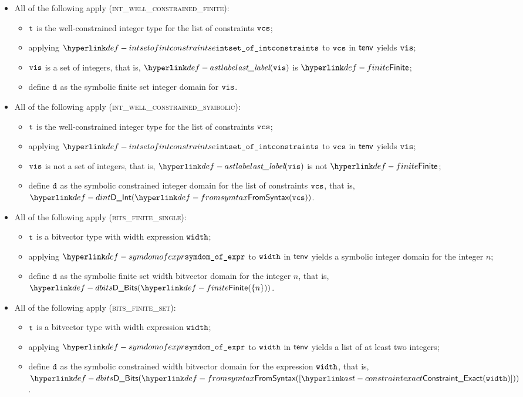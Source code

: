 \begin{itemize}
  \item All of the following apply (\textsc{int\_well\_constrained\_finite}):
  \begin{itemize}
    \item $\texttt{t}$ is the well-constrained integer type for the list of constraints $\texttt{vcs}$;
    \item applying $\intsetofintconstraints$ to $\texttt{vcs}$ in $\textsf{tenv}$ yields $\texttt{vis}$;
    \item $\texttt{vis}$ is a set of integers, that is, $\astlabel(\vis)$ is $\Finite$;
    \item define $\texttt{d}$ as the symbolic finite set integer domain for $\texttt{vis}$.
  \end{itemize}

  \item All of the following apply (\textsc{int\_well\_constrained\_symbolic}):
  \begin{itemize}
    \item $\texttt{t}$ is the well-constrained integer type for the list of constraints $\texttt{vcs}$;
    \item applying $\intsetofintconstraints$ to $\texttt{vcs}$ in $\textsf{tenv}$ yields $\texttt{vis}$;
    \item $\texttt{vis}$ is not a set of integers, that is, $\astlabel(\vis)$ is not $\Finite$;
    \item define $\texttt{d}$ as the symbolic constrained integer domain for the list of constraints $\texttt{vcs}$, that is, $\DInt(\FromSyntax(\vcs))$.
  \end{itemize}

  \item All of the following apply (\textsc{bits\_finite\_single}):
  \begin{itemize}
    \item $\texttt{t}$ is a bitvector type with width expression $\texttt{width}$;
    \item applying $\symdomofexpr$ to $\texttt{width}$ in $\textsf{tenv}$ yields a symbolic integer domain for the integer $n$;
    \item define $\texttt{d}$ as the symbolic finite set width bitvector domain for the integer $n$, that is, \\
          $\DBits(\Finite(\{n\}))$.
  \end{itemize}

  \item All of the following apply (\textsc{bits\_finite\_set}):
  \begin{itemize}
    \item $\texttt{t}$ is a bitvector type with width expression $\texttt{width}$;
    \item applying $\symdomofexpr$ to $\texttt{width}$ in $\textsf{tenv}$ yields a list of at least two integers;
    \item define $\texttt{d}$ as the symbolic constrained width bitvector domain for the expression $\texttt{width}$, that is, $\DBits(\FromSyntax([\ConstraintExact(\width)]))$.
  \end{itemize}


\end{itemize}
